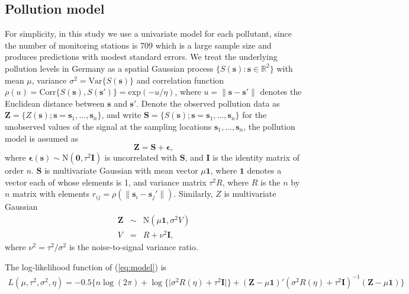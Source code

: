 \documentclass[12,]{article}
\begin{document}
\hypertarget{pollution-model}{%
\subsection{Pollution model}\label{pollution-model}}

For simplicity, in this study we use a univariate model for each
pollutant, since the number of monitoring stations is 709 which is a
large sample size and produces predictions with modest standard errors.
We treat the underlying pollution levels in Germany as a spatial
Gaussian process \(\{S(\symbf{s}):\symbf{s}\in \mathbb{R}^{2}\}\) with
mean \(\mu\), variance \(\sigma^2=\mbox{Var}\{S(\symbf{s})\}\) and
correlation function
\(\rho(u)= \mbox{Corr}\{S(\symbf{s}), S(\symbf{s}\prime)\}= \mbox{exp}(-u/\eta)\),
where \(u=\lVert \symbf{s}-\symbf{s}\prime\rVert\) denotes the Euclidean
distance between \(\symbf{s}\) and \(\symbf{s}\prime\). Denote the
observed pollution data as
\(\symbf{Z}=\{Z(\symbf{s}); \symbf{s}= \symbf{s}_1,\dots,\symbf{s}_n\}\),
and write
\(\symbf{S}=\{S(\symbf{s}); \symbf{s}= \symbf{s}_1,\dots,\symbf{s}_n\}\)
for the unobserved values of the signal at the sampling locations
\(\symbf{s}_1,\dots,\symbf{s}_n\), the pollution model is assumed as
\begin{equation}
\symbf{Z} = \symbf{S} + \symbf{\epsilon},
\label{eq:model}
\end{equation} where
\(\symbf{\epsilon} (\symbf{s}) \sim \mbox{N} (\symbf{0}, \tau^2\symbf{I})\)
is uncorrelated with \(\symbf{S}\), and \(\symbf{I}\) is the identity
matrix of order \(n\). \(\symbf{S}\) is multivariate Gaussian with mean
vector \(\mu \symbf{1}\), where \(\symbf{1}\) denotes a vector each of
whose elements is 1, and variance matrix \(\tau^2 R\), where \(R\) is
the \(n\) by \(n\) matrix with elements
\(r_{ij}=\rho(\lVert \symbf{s}_i-\symbf{s}_j\prime\rVert)\). Similarly,
\(Z\) is multivariate Gaussian \begin{eqnarray}
\symbf{Z} &\sim& \mbox{N} (\mu\symbf{1}, \sigma^2 V)\\\nonumber
V &=&  R+\nu^2\symbf{I},
\label{eq:var}
\end{eqnarray} where \(\nu^2=\tau^2/\sigma^2\) is the noise-to-signal
variance ratio.

The log-likelihood function of (\ref{eq:model}) is \begin{eqnarray}
L(\mu, \tau^2,\sigma^2,\eta) = -0.5\{n\log(2\pi)+\log\{\mid \sigma^2 R(\eta)+\tau^2\symbf{I} \mid\}+(\symbf{Z}- \mu\symbf{1})\prime ( \sigma^2 R(\eta)+\tau^2\symbf{I})^{-1} (\symbf{Z} - \mu\symbf{1})\}
\label{eq:likelihood}
\end{eqnarray}
\end{document}
